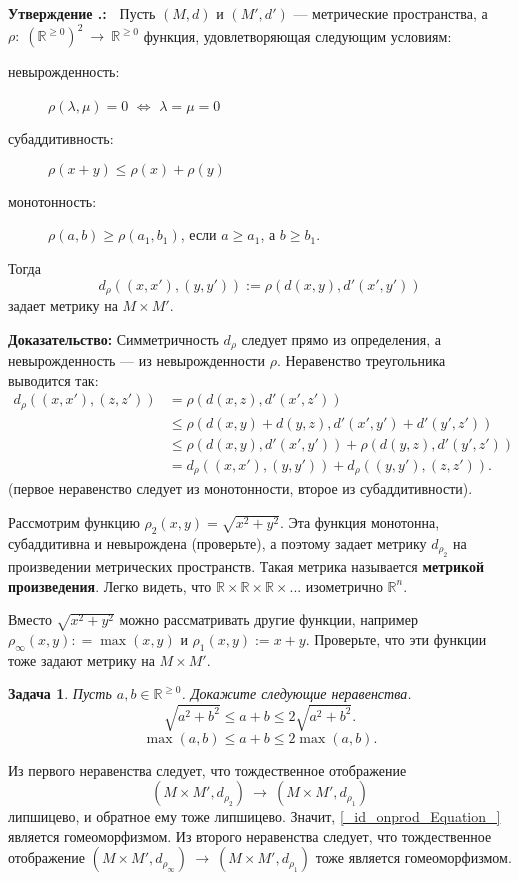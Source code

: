 \documentclass[12pt]{book}
\newcommand{\arrow}{{\:\longrightarrow\:}}
\def\endproof{\hbox{\vrule width 5pt height 5pt depth 0pt}}
\def\R{{\mathbb R}}
\theoremstyle{upshape}
\newtheorem{zadacha}{Задача}[chapter]
\theoremstyle{generic}
\newtheorem{remark}[teorema]{Замечание}
\def\замечание{\begin{remark}}
\def\еза{\end{remark}}
\theoremstyle{upshapenonumber}
\newtheorem{ukazanie}{Указание}[section]
\newcommand{\следствие}{%
     \refstepcounter{teorema}
     {\noindent\bf Следствие \thechapter.\arabic{teorema}:\ }}
\newcommand{\пример}{%
     \refstepcounter{teorema}
     {\noindent\bf Пример \thechapter.\arabic{teorema}:\ }}
\newcommand{\лемма}{%
     \refstepcounter{teorema}
     {\noindent\bf Лемма \thechapter.\arabic{teorema}:\ }}
\newcommand{\теорема}{%
     \refstepcounter{teorema}
     {\noindent\bf Теорема \thechapter.\arabic{teorema}:\ }}
\newcommand{\утверждение}{%
     \refstepcounter{teorema}
     {\noindent\bf Утверждение \thechapter.\arabic{teorema}:\ }}
\def\хфилл{\hfill}
\def\бф{\bf}
\def\ем{\em}
\def\задача{\begin{zadacha}}
\def\ез{\end{zadacha}}
\def\указание{\begin{ukazanie}}
\def\еу{\end{ukazanie}}
\def\ео{\end{opredelenie}}
\def\енум{\begin{enumerate}}
\def\ее{\end{enumerate}}
\begin{document}
\хфилл

\утверждение
Пусть $(M, d)$ и $(M', d')$ --- метрические
пространства, а $\rho:\; (\R^{\geq 0})^2\arrow \R^{\geq 0}$ функция,
удовлетворяющая следующим  условиям: 
\begin{description}
\item[невырожденность:] $\rho(\lambda, \mu)=0$ $\Leftrightarrow$ $\lambda=\mu=0$
\item[субаддитивность:] $\rho(x+y) \leq \rho(x)+\rho(y)$
\item[монотонность:] $\rho (a, b)\geq \rho(a_1, b_1)$, если $a\geq a_1$,
а $b\geq b_1$.
\end{description}
Тогда
\[
d_\rho((x, x'), (y, y')):= \rho(d(x,y), d'(x',y'))
\]
задает метрику на $M\times M'$.

\хфилл

{\бф Доказательство:}
Симметричность $d_\rho$ следует прямо из определения,
а невырожденность --- из невырожденности $\rho$.
Неравенство треугольника выводится так:
\begin{align*}
d_\rho((x, x'), (z, z')) & = 
\rho(d(x,z), d'(x', z'))
\\ \ &\leq \rho(d(x,y)+ d(y,z), d'(x',y')+ d'(y',z'))\\ \ &\leq 
\rho(d(x,y), d'(x',y')) + \rho(d(y, z), d'(y',z'))\\ \ & = 
d_\rho((x, x'), (y, y'))+ d_\rho((y, y'), (z, z')).
\end{align*}
(первое неравенство следует из монотонности,
второе из субаддитивности). \endproof

\хфилл

Рассмотрим функцию $\rho_2(x,y) = \sqrt{x^2 + y^2}$.
Эта функция монотонна, субаддитивна и невырождена
(проверьте), а поэтому задает метрику $d_{\rho_2}$
на произведении метрических пространств.
Такая метрика называется {\бф метрикой произведения}. 
Легко видеть, что $\R \times \R \times \R \times ...$
изометрично $\R^n$.

Вместо $\sqrt{x^2 + y^2}$ можно рассматривать
другие функции, например $\rho_\infty(x,y): = \max(x,y)$
и $\rho_1(x,y) := x+y$. Проверьте, что эти функции
тоже задают метрику на $M\times M'$.

\задача
Пусть $a, b \in \R^{\geq 0}$.
Докажите следующие неравенства.
\[
\sqrt{a^2+ b^2}\leq a+b \leq 2 \sqrt{a^2+ b^2}.
\]
\[
\max(a,b) \leq a+b \leq 2 \max(a,b).
\]
\ез

Из первого неравенства следует, что тождественное отображение
\begin{equation}\label{_id_onprod_Equation_}
(M\times M', d_{\rho_2}) \arrow (M\times M', d_{\rho_1})
\end{equation}
липшицево, и обратное ему тоже липшицево. Значит,
\eqref{_id_onprod_Equation_}
является гомеоморфизмом. Из второго неравенства
следует, что тождественное отображение
$(M\times M', d_{\rho_\infty}) \arrow (M\times M',
d_{\rho_1})$ тоже является гомеоморфизмом.
\end{document}
